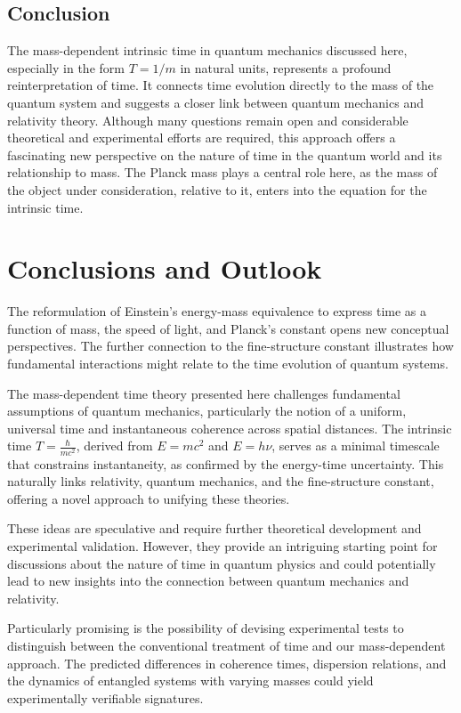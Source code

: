 \documentclass{article}
\begin{document}
\subsection{Conclusion}

The mass-dependent intrinsic time in quantum mechanics discussed here, especially in the form \(T = 1/m\) in natural units, represents a profound reinterpretation of time. It connects time evolution directly to the mass of the quantum system and suggests a closer link between quantum mechanics and relativity theory. Although many questions remain open and considerable theoretical and experimental efforts are required, this approach offers a fascinating new perspective on the nature of time in the quantum world and its relationship to mass. The Planck mass plays a central role here, as the mass of the object under consideration, relative to it, enters into the equation for the intrinsic time.

\section{Conclusions and Outlook}

The reformulation of Einstein's energy-mass equivalence to express time as a function of mass, the speed of light, and Planck's constant opens new conceptual perspectives. The further connection to the fine-structure constant illustrates how fundamental interactions might relate to the time evolution of quantum systems.

The mass-dependent time theory presented here challenges fundamental assumptions of quantum mechanics, particularly the notion of a uniform, universal time and instantaneous coherence across spatial distances. The intrinsic time \(T = \frac{\hbar}{mc^2}\), derived from \(E = mc^2\) and \(E = h\nu\), serves as a minimal timescale that constrains instantaneity, as confirmed by the energy-time uncertainty. This naturally links relativity, quantum mechanics, and the fine-structure constant, offering a novel approach to unifying these theories.

These ideas are speculative and require further theoretical development and experimental validation. However, they provide an intriguing starting point for discussions about the nature of time in quantum physics and could potentially lead to new insights into the connection between quantum mechanics and relativity.

Particularly promising is the possibility of devising experimental tests to distinguish between the conventional treatment of time and our mass-dependent approach. The predicted differences in coherence times, dispersion relations, and the dynamics of entangled systems with varying masses could yield experimentally verifiable signatures.
\end{document}
